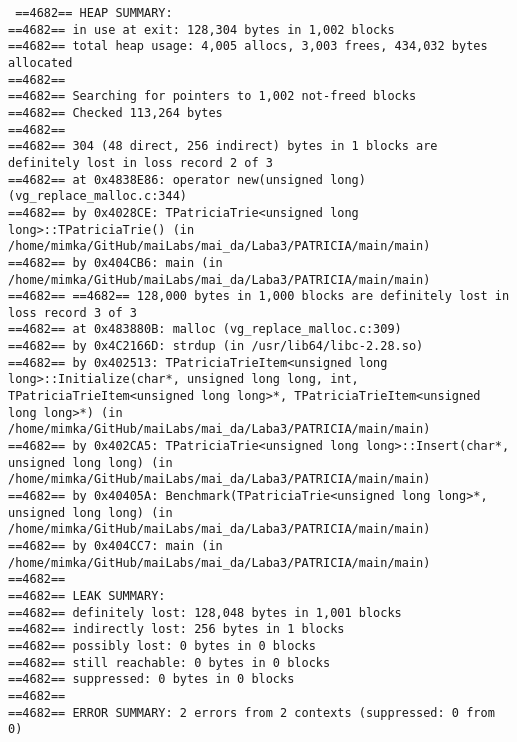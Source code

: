 \documentclass[12pt]{article}
\begin{document}
{\texttt{
==4682== HEAP SUMMARY:\\
==4682==     in use at exit: 128,304 bytes in 1,002 blocks\\
==4682==   total heap usage: 4,005 allocs, 3,003 frees, 434,032 bytes allocated\\
==4682== \\
==4682== Searching for pointers to 1,002 not-freed blocks\\
==4682== Checked 113,264 bytes\\
==4682== \\
==4682== 304 (48 direct, 256 indirect) bytes in 1 blocks are definitely lost in loss record 2 of 3\\
==4682==    at 0x4838E86: operator new(unsigned long) (vg_replace_malloc.c:344)\\
==4682==    by 0x4028CE: TPatriciaTrie<unsigned long long>::TPatriciaTrie() (in /home/mimka/GitHub/maiLabs/mai_da/Laba3/PATRICIA/main/main)\\
==4682==    by 0x404CB6: main (in /home/mimka/GitHub/maiLabs/mai_da/Laba3/PATRICIA/main/main)\\
==4682== 
==4682== 128,000 bytes in 1,000 blocks are definitely lost in loss record 3 of 3\\
==4682==    at 0x483880B: malloc (vg_replace_malloc.c:309)\\
==4682==    by 0x4C2166D: strdup (in /usr/lib64/libc-2.28.so)\\
==4682==    by 0x402513: TPatriciaTrieItem<unsigned long long>::Initialize(char*, unsigned long long, int, TPatriciaTrieItem<unsigned long long>*, TPatriciaTrieItem<unsigned long long>*) (in /home/mimka/GitHub/maiLabs/mai_da/Laba3/PATRICIA/main/main)\\
==4682==    by 0x402CA5: TPatriciaTrie<unsigned long long>::Insert(char*, unsigned long long) (in /home/mimka/GitHub/maiLabs/mai_da/Laba3/PATRICIA/main/main)\\
==4682==    by 0x40405A: Benchmark(TPatriciaTrie<unsigned long long>*, unsigned long long) (in /home/mimka/GitHub/maiLabs/mai_da/Laba3/PATRICIA/main/main)\\
==4682==    by 0x404CC7: main (in /home/mimka/GitHub/maiLabs/mai_da/Laba3/PATRICIA/main/main)\\
==4682== \\
==4682== LEAK SUMMARY:\\
==4682==    definitely lost: 128,048 bytes in 1,001 blocks\\
==4682==    indirectly lost: 256 bytes in 1 blocks\\
==4682==      possibly lost: 0 bytes in 0 blocks\\
==4682==    still reachable: 0 bytes in 0 blocks\\
==4682==         suppressed: 0 bytes in 0 blocks\\
==4682== \\
==4682== ERROR SUMMARY: 2 errors from 2 contexts (suppressed: 0 from 0)\\
}}
\end{document}
